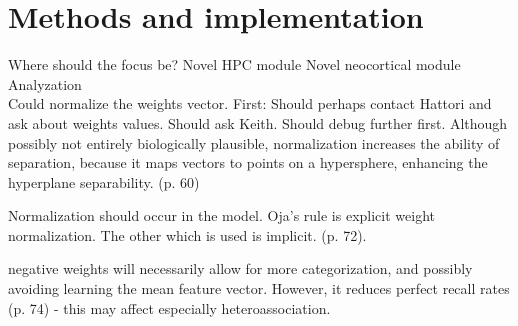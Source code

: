 
\chapter{Methods and implementation}\label{chpt:methods}
Where should the focus be?
Novel HPC module
Novel neocortical module
Analyzation
\\

Could normalize the weights vector. First: Should perhaps contact Hattori and ask about weights values. Should ask Keith. Should debug further first.
Although possibly not entirely biologically plausible, normalization increases the ability of separation, because it maps vectors to points on a hypersphere, enhancing the hyperplane separability. (p. 60)

Normalization should occur in the model. Oja's rule is explicit weight normalization. The other which is used is implicit. (p. 72).

negative weights will necessarily allow for more categorization, and possibly avoiding learning the mean feature vector. However, it reduces perfect recall rates (p. 74) - this may affect especially heteroassociation.